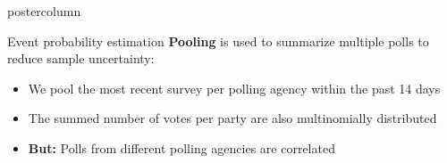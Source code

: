 \documentclass[final,hyperref={pdfpagelabels=false}]{beamer}
\let\olditem\item
\renewcommand\item{\justifying\olditem} %
\newcommand{\bfBlue}[1]{\textcolor{koaladarkestblue}{\textbf{#1}}}
\newcommand{\badred}[1]{\textcolor{badred}{#1}}
\newcommand*\circled[1]{\tikz[baseline=(char.base)]{
\node[shape=circle,draw,inner sep=2pt] (char) {#1};}}
\begin{document}
\begin{frame}
\begin{columns}
\begin{column}{1\textwidth}
\begin{columns}[T]
\begin{column}{.484\textwidth}
\begin{beamercolorbox}[center,wd=\textwidth]{postercolumn}
\begin{minipage}[T]{.95\textwidth}
\begin{block}{\footnotesize \circled{1} Event probability estimation}
\bfBlue{Pooling} is used to summarize multiple polls to reduce sample uncertainty:
\begin{minipage}{\textwidth}
\hspace{0.5in}
\begin{itemize}
  \item We pool the most recent survey per polling agency within the past 14 days
  \item The summed number of votes per party are also multinomially distributed
  \item \textbf{\badred{But:}} Polls from different polling agencies are correlated
\end{itemize}
\end{minipage}
\\[0.8cm]

\end{block}
\end{minipage}
\end{beamercolorbox}
\end{column}
\end{columns}
\end{column}
\end{columns}
\end{frame}
\end{document}
